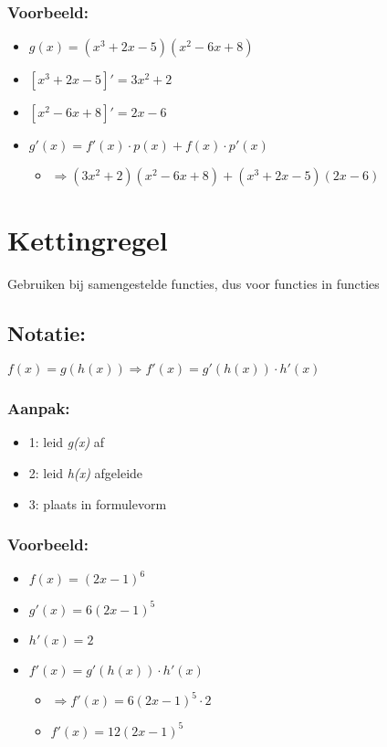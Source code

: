 \documentclass[11pt]{article}
\begin{document}
\subsubsection{Voorbeeld:}
\label{sec:org9740902}
\begin{itemize}
\item \(g(x) = (x^{3}+2x-5)(x^{2}-6x+8)\)
\item \([x^{3}+2x-5]' = 3x^{2}+2\)
\item \([x^{2}-6x+8]' = 2x-6\)
\item \(g'(x) = f'(x) \cdot p(x) + f(x) \cdot p'(x)\)
\begin{itemize}
\item \(\Rightarrow  (3x^{2}+2)(x^{2}-6x+8) + (x^{3}+2x-5)(2x-6)\)
\end{itemize}
\end{itemize}



\section{Kettingregel}
\label{sec:orgafe9936}
Gebruiken bij samengestelde functies, dus voor functies in functies
\subsection{Notatie:}
\label{sec:orgb24be95}
\(f(x) = g(h(x)) \Rightarrow f'(x) = g'(h(x)) \cdot h'(x)\)
\subsubsection{Aanpak:}
\label{sec:org35b71b5}
\begin{itemize}
\item 1: leid \textit{g(x)} af
\item 2: leid \textit{h(x)} afgeleide
\item 3: plaats in formulevorm
\end{itemize}
\subsubsection{Voorbeeld:}
\label{sec:orgb68b964}
\begin{itemize}
\item \(f(x) = (2x-1)^{6}\)
\item \(g'(x) = 6(2x-1)^{5}\)
\item \(h'(x) = 2\)
\item \(f'(x) = g'(h(x)) \cdot h'(x)\)
\begin{itemize}
\item \(\Rightarrow f'(x) = 6(2x-1)^5 \cdot 2\)
\item \(f'(x) = 12(2x-1)^5\)
\end{itemize}
\end{itemize}
\end{document}
